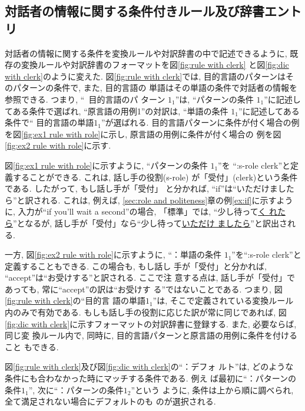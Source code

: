 \subsection{対話者の情報に関する条件付きルール及び辞書エントリ}
\label{subsec:rule and dic with role}

対話者の情報に関する条件を変換ルールや対訳辞書の中で記述できるように, 
既存の変換ルールや対訳辞書のフォーマットを図\ref{fig:rule with clerk}
と図\ref{fig:dic with clerk}のように変えた. 図\ref{fig:rule with
clerk}では, 目的言語のパターンはそのパターンの条件で, また, 目的言語の
単語はその単語の条件で対話者の情報を参照できる. つまり, ``~目的言語のパ
ターン $1_1$''は, ``パターンの条件 $1_1$''に記述してある条件で選ばれ, 
``原言語の用例1''の対訳は, ``単語の条件 $1_1$''に記述してある条件で``
目的言語の単語$1_1$''が選ばれる. 目的言語パターンに条件が付く場合の例
を図\ref{fig:ex1 rule with role}に示し, 原言語の用例に条件が付く場合の
例を図\ref{fig:ex2 rule with role}に示す. 

図\ref{fig:ex1 rule with role}に示すように, ``パターンの条件 $1_1$''を
``:s-role clerk''と定義することができる. これは, 話し手の役割(s-role)
が「受付」(clerk)という条件である. したがって, もし話し手が「受付」
と分かれば, ``if''は``いただけましたら''と訳される. これは, 例えば, 
\ref{sec:role and politeness}章の例\ref{ex:if}に示すように, 入力が``if
you'll wait a second''の場合, 「標準」では, ``少し待って\underline {く
れたら}''となるが, 話し手が「受付」なら``少し待って\underline{いただけ
ましたら}''と訳出される. 

一方, 図\ref{fig:ex2 rule with role}に示すように, ``：単語の条件
$1_1$''を``:s-role clerk''と定義することもできる. この場合も, もし話し
手が「受付」と分かれば, ``accept''は``お受けする''と訳される. ここで注
意する点は, 話し手が「受付」であっても, 常に``accept''の訳は``お受けす
る''ではないことである. つまり, 図\ref{fig:rule with clerk}の``目的言
語の単語$1_1$''は, そこで定義されている変換ルール内のみで有効である. 
もしも話し手の役割に応じた訳が常に同じであれば, 図\ref{fig:dic with
clerk}に示すフォーマットの対訳辞書に登録する. また, 必要ならば, 同じ変
換ルール内で, 同時に, 目的言語パターンと原言語の用例に条件を付けること
もできる. 

図\ref{fig:rule with clerk}及び図\ref{fig:dic with clerk}の``：デフォ
ルト''は, どのような条件にも合わなかった時にマッチする条件である. 例え
ば最初に``：パターンの条件$1_1$'', 次に``：パターンの条件$1_2$''という
ように, 条件は上から順に調べられ, 全て満足されない場合にデフォルトのも
のが選択される. 

